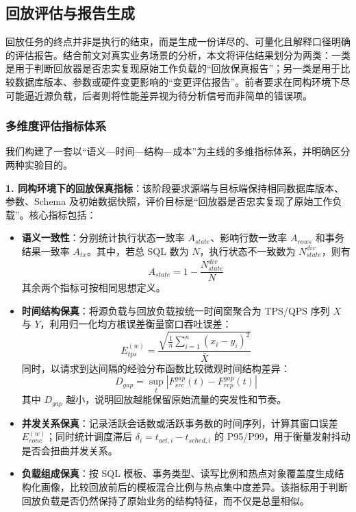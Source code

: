 \subsection{回放评估与报告生成}
\label{sec:evaluation}
回放任务的终点并非是执行的结束，而是生成一份详尽的、可量化且解释口径明确的评估报告。结合前文对真实业务场景的分析，本文将评估结果划分为两类：一类是用于判断回放器是否忠实复现原始工作负载的“回放保真报告”；另一类是用于比较数据库版本、参数或硬件变更影响的“变更评估报告”。前者要求在同构环境下尽可能逼近源负载，后者则将性能差异视为待分析信号而非简单的错误项。

\subsubsection{多维度评估指标体系}
我们构建了一套以“语义—时间—结构—成本”为主线的多维指标体系，并明确区分两种实验目的。

\textbf{1. 同构环境下的回放保真指标}：该阶段要求源端与目标端保持相同数据库版本、参数、Schema 及初始数据快照，评价目标是“回放器是否忠实复现了原始工作负载”。核心指标包括：
\begin{itemize}
    \item \textbf{语义一致性}：分别统计执行状态一致率 $A_{state}$、影响行数一致率 $A_{rows}$ 和事务结果一致率 $A_{tx}$。其中，若总 SQL 数为 $N$，执行状态不一致数为 $N_{state}^{div}$，则有
    \begin{equation}
    A_{state} = 1 - \frac{N_{state}^{div}}{N}
    \end{equation}
    其余两个指标可按相同思想定义。
    \item \textbf{时间结构保真}：将源负载与回放负载按统一时间窗聚合为 TPS/QPS 序列 $X$ 与 $Y$，利用归一化均方根误差衡量窗口吞吐误差：
    \begin{equation}
    E_{tps}^{(w)} = \frac{\sqrt{\frac{1}{n}\sum_{i=1}^{n}(x_i-y_i)^2}}{\bar{X}}
    \end{equation}
    同时，以请求到达间隔的经验分布函数比较微观时间结构差异：
    \begin{equation}
    D_{gap} = \sup_t \left|F_{src}^{gap}(t)-F_{rep}^{gap}(t)\right|
    \end{equation}
    其中 $D_{gap}$ 越小，说明回放越能保留原始流量的突发性和节奏。
    \item \textbf{并发关系保真}：记录活跃会话数或活跃事务数的时间序列，计算其窗口误差 $E_{conc}^{(w)}$；同时统计调度滞后 $\delta_i=t_{act,i}-t_{sched,i}$ 的 P95/P99，用于衡量发射抖动是否会扭曲并发关系。
    \item \textbf{负载组成保真}：按 SQL 模板、事务类型、读写比例和热点对象覆盖度生成结构化画像，比较回放前后的模板混合比例与热点集中度差异。该指标用于判断回放负载是否仍然保持了原始业务的结构特征，而不仅是总量相似。
\end{itemize}

